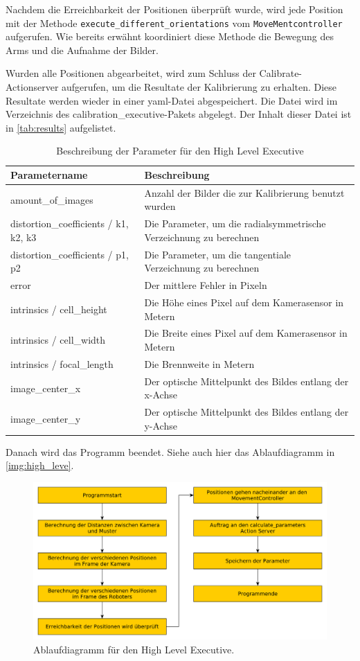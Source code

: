 Nachdem die Erreichbarkeit der Positionen überprüft wurde, wird jede Position mit der Methode \texttt{execute\_different\_orientations} vom \texttt{MoveMentcontroller} aufgerufen. Wie bereits erwähnt koordiniert diese Methode die Bewegung des Arms und die Aufnahme der Bilder.

Wurden alle Positionen abgearbeitet, wird zum Schluss der Calibrate-Actionserver aufgerufen, um die Resultate der Kalibrierung zu erhalten. Diese Resultate werden wieder in einer yaml-Datei abgespeichert. Die Datei wird im Verzeichnis des calibration\_executive-Pakets abgelegt. Der Inhalt dieser Datei ist in \autoref{tab:results} aufgelistet.
\begin{table}
\begin{tabularx}{\textwidth}{|l|X|}
	\hline
	Parametername & Beschreibung \\\hline
	amount\_of\_images & Anzahl der Bilder die zur Kalibrierung benutzt wurden\\\hline
	distortion\_coefficients / k1, k2, k3 & Die Parameter, um die radialsymmetrische Verzeichnung zu berechnen \\\hline
	distortion\_coefficients / p1, p2 & Die Parameter, um die tangentiale Verzeichnung zu berechnen \\\hline
	error & Der mittlere Fehler in Pixeln \\\hline
	intrinsics / cell\_height & Die Höhe eines Pixel auf dem Kamerasensor in Metern \\\hline
	intrinsics / cell\_width & Die Breite eines Pixel auf dem Kamerasensor in Metern \\\hline
	intrinsics / focal\_length & Die Brennweite in Metern \\\hline
	image\_center\_x & Der optische Mittelpunkt des Bildes entlang der x-Achse \\\hline
	image\_center\_y & Der optische Mittelpunkt des Bildes entlang der y-Achse \\\hline
\end{tabularx}
\caption{Beschreibung der Parameter für den High Level Executive}
\label{tab:results}
\end{table}

Danach wird das Programm beendet. Siehe auch hier das Ablaufdiagramm in \autoref{img:high_leve}.
\begin{figure}
\centering
\includegraphics[width=\textwidth]{images/high_level}
\caption{Ablaufdiagramm für den High Level Executive.}\label{img:high_leve}
\end{figure}
